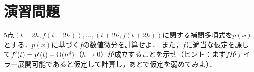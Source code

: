 \documentclass[../../main]{subfiles}
\begin{document}
\section*{演習問題}
\begin{problem}
5点\((t-2h,f(t-2h)),\dots,(t+2h,f(t+2h))\)に関する補間多項式を\(p(x)\)とする．\(p(x)\)に基づく\(f\)の数値微分を計算せよ．
また，\(f\)に適当な仮定を課して\(f'(t)=p'(t)+\operatorname{O}(h^4)\)（\(h\to 0\)）が成立することを示せ（ヒント：まず\(f\)がテイラー展開可能であると仮定して計算し，あとで仮定を弱めてみよ）．
\end{problem}
\end{document}

